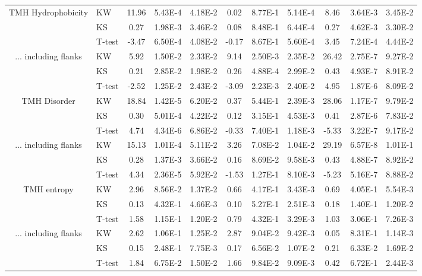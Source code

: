 \begin{table}[htbp]
\begin{tabular}{clccccccccc}
		\midrule
		\multirow{3}[0]{*}{TMH Hydrophobicity} &  KW & 11.96 & 5.43E-4 & 4.18E-2 & 0.02  & 8.77E-1 & 5.14E-4 & 8.46  & 3.64E-3 & 3.45E-2 \\
								&  KS & 0.27  & 1.98E-3 & 3.46E-2 & 0.08  & 8.48E-1 & 6.44E-4 & 0.27  & 4.62E-3 & 3.30E-2 \\
								&  T-test & -3.47 & 6.50E-4 & 4.08E-2 & -0.17 & 8.67E-1 & 5.60E-4 & 3.45  & 7.24E-4 & 4.44E-2 \\
		\midrule
		\multirow{3}[0]{*}{... including flanks} &  KW & 5.92  & 1.50E-2 & 2.33E-2 & 9.14  & 2.50E-3 & 2.35E-2 & 26.42 & 2.75E-7 & 9.27E-2 \\
								&  KS & 0.21  & 2.85E-2 & 1.98E-2 & 0.26  & 4.88E-4 & 2.99E-2 & 0.43  & 4.93E-7 & 8.91E-2 \\
								&  T-test & -2.52 & 1.25E-2 & 2.43E-2 & -3.09 & 2.23E-3 & 2.40E-2 & 4.95  & 1.87E-6 & 8.09E-2 \\
	  \midrule
		\multirow{3}[0]{*}{TMH Disorder} &  KW & 18.84 & 1.42E-5 & 6.20E-2 & 0.37  & 5.44E-1 & 2.39E-3 & 28.06 & 1.17E-7 & 9.79E-2 \\
								&  KS & 0.30  & 5.01E-4 & 4.22E-2 & 0.12  & 3.15E-1 & 4.53E-3 & 0.41 & 2.87E-6 & 7.83E-2 \\
								&  T-test & 4.74  & 4.34E-6 & 6.86E-2 & -0.33 & 7.40E-1 & 1.18E-3 & -5.33 & 3.22E-7 & 9.17E-2 \\
		\midrule
		\multirow{3}[0]{*}{... including flanks} &  KW & 15.13 & 1.01E-4 & 5.11E-2 & 3.26  & 7.08E-2 & 1.04E-2 & 29.19 & 6.57E-8 & 1.01E-1 \\
								&  KS & 0.28  & 1.37E-3 & 3.66E-2 & 0.16  & 8.69E-2 & 9.58E-3 & 0.43 & 4.88E-7 & 8.92E-2 \\
								&  T-test & 4.34  & 2.36E-5 & 5.92E-2 & -1.53 & 1.27E-1 & 8.10E-3 & -5.23 & 5.16E-7 & 8.88E-2 \\
		\midrule
		\multirow{3}[0]{*}{TMH entropy} &  KW & 2.96  & 8.56E-2 & 1.37E-2 & 0.66  & 4.17E-1 & 3.43E-3 & 0.69  & 4.05E-1 & 5.54E-3 \\
								&  KS & 0.13  & 4.32E-1 & 4.66E-3 & 0.10  & 5.27E-1 & 2.51E-3 & 0.18 & 1.40E-1 & 1.20E-2 \\
								&  T-test & 1.58  & 1.15E-1 & 1.20E-2 & 0.79  & 4.32E-1 & 3.29E-3 & 1.03 & 3.06E-1 & 7.26E-3 \\
		\midrule
		\multirow{3}[0]{*}{... including flanks} &  KW & 2.62  & 1.06E-1 & 1.25E-2 & 2.87  & 9.04E-2 & 9.42E-3 & 0.05 & 8.31E-1 & 1.14E-3 \\
								&  KS & 0.15  & 2.48E-1 & 7.75E-3 & 0.17  & 6.56E-2 & 1.07E-2 & 0.21 & 6.33E-2 & 1.69E-2 \\
								&  T-test & 1.84  & 6.75E-2 & 1.50E-2 & 1.66  & 9.84E-2 & 9.09E-3 & 0.42 & 6.72E-1 & 2.44E-3 \\
		\end{tabular}%
						\label{table:organellesswissstats}
		\end{table}%

